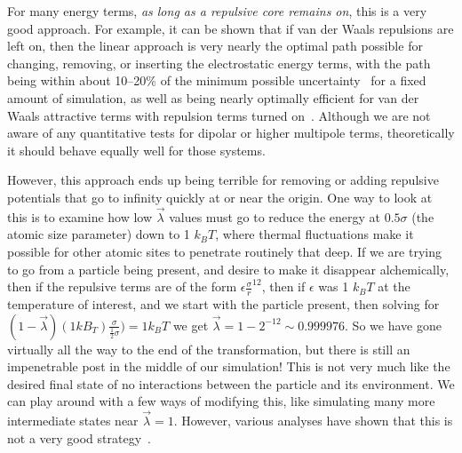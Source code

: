 \documentclass[9pt,bestpractices]{livecoms}
\begin{document}
For many energy terms, \textit{as long as a repulsive core remains on}, this is a very good approach. For example, it can be shown that if van der Waals repulsions are left on, then the linear approach is very nearly the optimal path possible for changing, removing, or inserting the electrostatic energy terms, with the path being within about 10--20\% of the minimum possible uncertainty~\cite{naden2015linear} for a fixed amount of simulation, as well as being nearly optimally efficient for van der Waals attractive terms with repulsion terms turned on~\cite{naden2014linear}. Although we are not aware of any quantitative tests for dipolar or higher multipole terms, theoretically it should behave equally well for those systems.

However, this approach ends up being terrible for removing or adding repulsive potentials that go to infinity quickly at or near the origin. One way to look at this is to examine how low $\vec{\lambda}$ values must go to reduce the energy at $0.5\sigma$ (the atomic size parameter) down to 1 $k_BT$, where thermal fluctuations make it possible for other atomic sites to penetrate routinely that deep. If we are trying to go from a particle being present, and desire to make it disappear alchemically, then if the repulsive terms are of the form $\epsilon\frac{\sigma}{r}^{12}$, then if $\epsilon$ was 1 $k_BT$ at the temperature of interest, and we start with the particle present, then solving for $(1-\vec{\lambda})(1 kB_T)\frac{\sigma}{\frac{1}{2}\sigma}) = 1 k_B T$ we get $\vec{\lambda} = 1-2^{-12} \sim 0.999976$. So we have gone virtually all the way to the end of the transformation, but there is still an impenetrable post in the middle of our simulation! This is not very much like the desired final state of no interactions between the particle and its environment. We can play around with a few ways of modifying this, like simulating many more intermediate states near $\vec{\lambda}=1$. However, various analyses have shown that this is not a very good strategy~\cite{pham2011identifying, beutler1994avoiding, zacharias1994separationshifted, blondel2004ensemble, gapsys2012new}.
\end{document}
